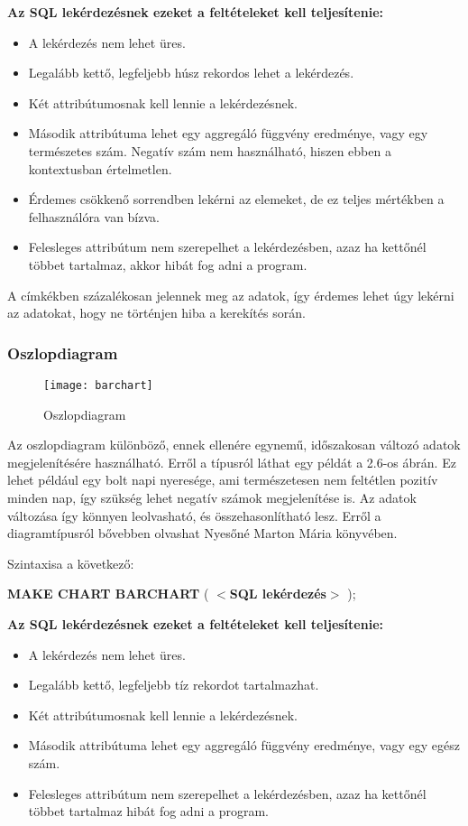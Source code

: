 \textbf{Az SQL lekérdezésnek ezeket a feltételeket kell teljesítenie:}
\begin{itemize}
  \item A lekérdezés nem lehet üres.
  \item Legalább kettő, legfeljebb húsz rekordos lehet a lekérdezés.
  \item Két attribútumosnak kell lennie a lekérdezésnek.
  \item Második attribútuma lehet egy aggregáló függvény eredménye, vagy egy természetes szám. 
  Negatív szám nem használható, hiszen ebben a kontextusban értelmetlen.
  \item Érdemes csökkenő sorrendben lekérni az elemeket, de ez teljes mértékben a felhasználóra van bízva.
  \item Felesleges attribútum nem szerepelhet a lekérdezésben, azaz ha kettőnél többet tartalmaz, akkor hibát fog adni a program.
\end{itemize}

A címkékben százalékosan jelennek meg az adatok, így érdemes lehet úgy lekérni az adatokat, hogy ne történjen hiba
a kerekítés során.
\newpage
\subsubsection{Oszlopdiagram}
\begin{figure}[ht]
  \begin{center}
    \texttt{[image: barchart]}
  \end{center}
 \caption{Oszlopdiagram}
\end{figure}

Az oszlopdiagram különböző, ennek ellenére egynemű, időszakosan változó adatok megjelenítésére használható. Erről a típusról láthat egy példát a
2.6-os ábrán. Ez lehet például egy
bolt napi nyeresége, ami természetesen nem feltétlen pozitív minden nap, így szükség lehet negatív számok megjelenítése is. Az adatok
változása így könnyen leolvasható, és összehasonlítható lesz. Erről a diagramtípusról bővebben olvashat Nyesőné Marton Mária
könyvében\cite{szamadat}.

Szintaxisa a következő:

\textbf{{\color{awesomeblue} MAKE CHART BARCHART }} ( \textbf{$<$SQL lekérdezés$>$} );

\textbf{Az SQL lekérdezésnek ezeket a feltételeket kell teljesítenie:}
\begin{itemize}
  \item A lekérdezés nem lehet üres.
  \item Legalább kettő, legfeljebb tíz rekordot tartalmazhat.
  \item Két attribútumosnak kell lennie a lekérdezésnek.
  \item Második attribútuma lehet egy aggregáló függvény eredménye, vagy egy egész szám.
  \item Felesleges attribútum nem szerepelhet a lekérdezésben, azaz ha kettőnél többet tartalmaz hibát fog adni a program.
\end{itemize}

